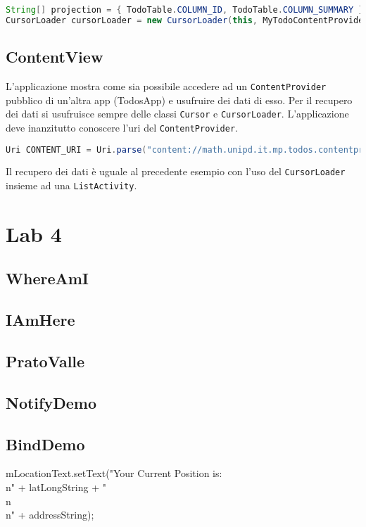 \begin{lstlisting}[language=Java]
String[] projection = { TodoTable.COLUMN_ID, TodoTable.COLUMN_SUMMARY };
CursorLoader cursorLoader = new CursorLoader(this, MyTodoContentProvider.CONTENT_URI, projection, null, null, null);
\end{lstlisting}


\subsection{ContentView}

L'applicazione mostra come sia possibile accedere ad un
\lstinline|ContentProvider| pubblico di un'altra app (TodosApp) e usufruire dei
dati di esso. Per il recupero dei dati si usufruisce sempre delle classi
\lstinline|Cursor| e \lstinline|CursorLoader|.
L'applicazione deve inanzitutto conoscere l'uri del \lstinline|ContentProvider|.
\begin{lstlisting}[language=Java]
Uri CONTENT_URI = Uri.parse("content://math.unipd.it.mp.todos.contentprovider/todos");
\end{lstlisting}
Il recupero dei dati è uguale al precedente esempio con l'uso del
\lstinline|CursorLoader| insieme ad una \lstinline|ListActivity|.

\section{Lab 4}

\subsection{WhereAmI}

\subsection{IAmHere}

\subsection{PratoValle}

\subsection{NotifyDemo}

\subsection{BindDemo}



\undef{\Activity}
\undef{\Intent}
\undef{\View}
\undef{\ViewGroup}
\undef{\LinearLayout}
\undef{\RelativeLayout}
\undef{\ScrollView}
\undef{\ListView}
\undef{\SharedPreferences}
\undef{\ListFragment}
\undef{\MainActivity}
\undef{\AsyncTask}
\undef{\FrameLayout}
\undef{\WorkoutListFragment}
\undef{\Fragment}
\undef{\SQLiteDatabase}
\undef{\SQLiteOpenHelper}
\undef{\Cursor}
				mLocationText.setText("Your Current Position is:\\n" + latLongString + "\\n\\n" + addressString);